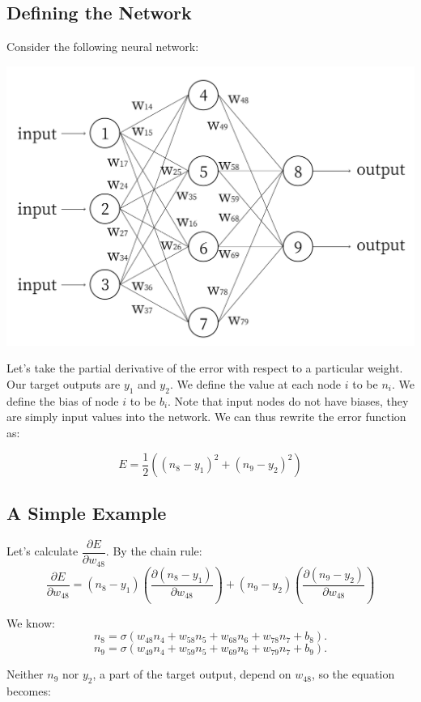 \documentclass{article}
\begin{document}
\subsection{Defining the Network}
Consider the following neural network:

\begin{center}
\includegraphics[scale=0.3]{nn2}
\end{center}

Let’s take the partial derivative of the error with respect to a particular weight. Our target outputs are $y_1$ and $y_2$. We define the value at each node $i$ to be $n_i$. We define the bias of node $i$ to be $b_i$. Note that input nodes do not have biases, they are simply input values into the network. We can thus rewrite the error function as:

\[E=\frac{1}{2}\left((n_8-y_1)^2 + (n_9-y_2)^2\right)\]

\subsection{A Simple Example}

Let's calculate $\dfrac{\partial E}{\partial w_{48}}$. By the chain rule:
\[\dfrac{\partial E}{\partial w_{48}} = (n_8-y_1)\left(\frac{\partial{(n_8-y_1)}}{\partial w_{48}}\right)+(n_9-y_2)\left(\frac{\partial{(n_9-y_2)}}{\partial w_{48}}\right)\]

We know:
\[n_8 = \sigma(w_{48}n_4 + w_{58}n_5 + w_{68}n_6 + w_{78}n_7 + b_8).\]
\[n_9 = \sigma(w_{49}n_4 + w_{59}n_5 + w_{69}n_6 + w_{79}n_7 + b_9).\]

Neither $n_9$ nor $y_2$, a part of the target output, depend on $w_{48}$, so the equation becomes:
\end{document}
